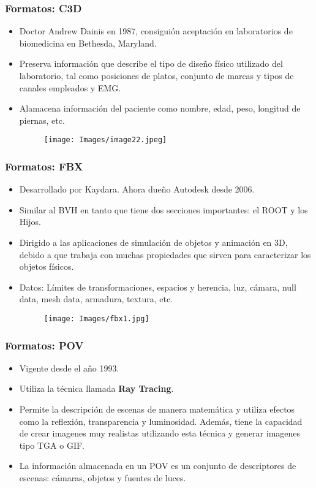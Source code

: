 \documentclass{beamer}
\begin{document}
\begin{frame}
\frametitle{Formatos: C3D}
\begin{itemize}

\item Doctor Andrew Dainis en 1987, consigui\' on aceptaci\' on en  laboratorios de biomedicina en Bethesda, Maryland.

\item Preserva informaci\' on que describe el tipo de dise\~ no f\' isico utilizado del laboratorio, tal como posiciones de platos, conjunto de marcas y tipos de canales empleados y EMG.

\item Alamacena informaci\' on del paciente como nombre, edad, peso, longitud de piernas, etc.

\begin{figure}[hbtp]
\centering
\texttt{[image: Images/image22.jpeg]}
\label{firg:c3d1}
\end{figure}

\end{itemize}
\end{frame}
\begin{frame}
\frametitle{Formatos: FBX}
\begin{itemize}
\item Desarrollado por Kaydara. Ahora due\~ no Autodesk desde 2006.
\item Similar al BVH en tanto que tiene dos secciones importantes: el ROOT y los Hijos.
\item Dirigido a las aplicaciones de simulaci\' on de objetos y animaci\' on en 3D, debido a que trabaja con muchas propiedades que sirven para caracterizar los objetos f\' isicos.
\item Datos: L\' imites de transformaciones, espacios y herencia, luz, c\' amara, null data, mesh data, armadura, textura, etc.
\begin{figure}[hbtp]
\centering
\texttt{[image: Images/fbx1.jpg]}
\label{firg:c3d1}
\end{figure}
\end{itemize}
\end{frame}
\begin{frame}
\frametitle{Formatos: POV}
\begin{itemize}
\item Vigente desde el a\~ no 1993.
\item Utiliza la t\' ecnica llamada \textbf{Ray Tracing}.
\item Permite la descripci\' on de escenas  de manera matem\' atica y utiliza efectos como la reflexi\' on, transparencia y luminosidad. Adem\' as, tiene la capacidad de crear imagenes muy realistas utilizando esta t\' ecnica y generar imagenes tipo TGA o GIF.
\item La informaci\' on almacenada en un POV es un conjunto de descriptores de escenas: c\' amaras, objetos y fuentes de luces. 
\end{itemize}
\end{frame}
\end{document}
